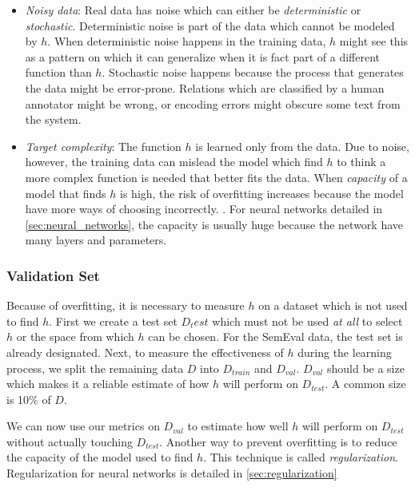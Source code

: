\begin{itemize}

\item \emph{Noisy data}: Real data has noise which can either be \emph{deterministic} or \emph{stochastic}. Deterministic noise is part of the data which cannot be modeled by $h$. When deterministic noise happens in the training data, $h$ might see this as a pattern on which it can generalize when it is fact part of a different function than $h$. Stochastic noise happens because the process that generates the data might be error-prone. Relations which are classified by a human annotator might be wrong, or encoding errors might obscure some text from the system. \citep{abu_book}

\item \emph{Target complexity}: The function $h$ is learned only from the data. Due to noise, however, the training data can mislead the model which find $h$ to think a more complex function is needed that better fits the data. When \emph{capacity} of a model that finds $h$ is high, the risk of overfitting increases because the model have more ways of choosing incorrectly. \citep[p. 107]{dl_book}. For neural networks detailed in \autoref{sec:neural_networks}, the capacity is usually huge because the network have many layers and parameters.         

\end{itemize}  

\subsubsection{Validation Set}
Because of overfitting, it is necessary to measure $h$ on a dataset which is not used to find $h$. First we create a test set $D_test$ which must not be used \emph{at all} to select $h$ or the space from which $h$ can be chosen. For the SemEval data, the test set is already designated. Next, to measure the effectiveness of $h$ during the learning process, we split the remaining data $D$ into $D_{train}$ and $D_{val}$. $D_{val}$ should be a size which makes it a reliable estimate of how $h$ will perform on $D_{test}$. A common size is 10\% of $D$. 

We can now use our metrics on $D_{val}$ to estimate how well $h$ will perform on $D_{test}$ without actually touching $D_{test}$. Another way to prevent overfitting is to reduce the capacity of the model used to find $h$. This technique is called \emph{regularization}. Regularization for neural networks is detailed in \autoref{sec:regularization}  







